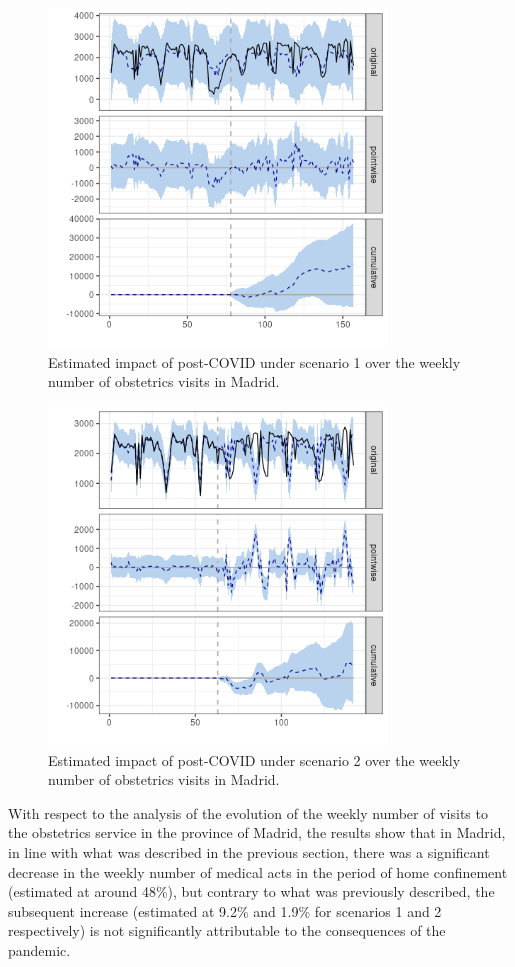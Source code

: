 \documentclass[9pt]{osa-supplemental-document}
\begin{document}
\begin{center}
\begin{figure}[H]
\includegraphics[width=9cm]{obstetrics_post_scen1_Madrid.png}\caption{Estimated impact of post-COVID under scenario 1 over the weekly number of obstetrics visits in Madrid.}
\end{figure}
\end{center}

\begin{center}
  \begin{figure}[H]
    \includegraphics[width=9cm]{obstetrics_post_scen2_Madrid.png}\caption{Estimated impact of post-COVID under scenario 2 over the weekly number of obstetrics visits in Madrid.}
  \end{figure}
  \end{center}

With respect to the analysis of the evolution of the weekly number of visits to the obstetrics service in the province of Madrid, the results show that in Madrid, in line with what was described in the previous section, there was a significant decrease in the weekly number of medical acts in the period of home confinement (estimated at around 48\%), but contrary to what was previously described, the subsequent increase (estimated at 9.2\% and 1.9\% for scenarios 1 and 2 respectively) is not significantly attributable to the consequences of the pandemic.
\end{document}
